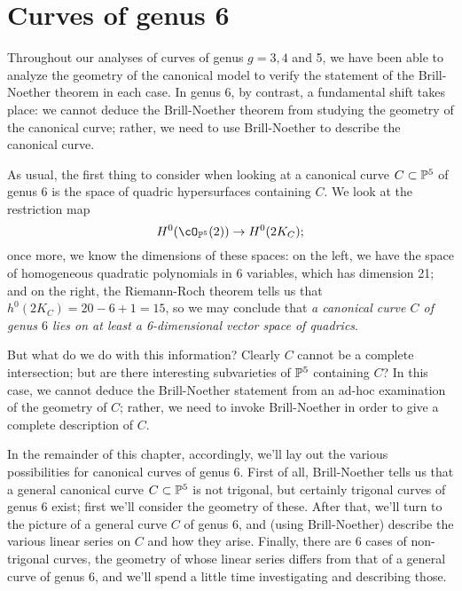

\chapter{Curves of genus 6}\label{genus 6 chapter}


Throughout our analyses of curves of genus $g = 3, 4$ and 5, we have been able to analyze the geometry of the canonical model to verify the statement of the Brill-Noether theorem in each case. In genus 6, by contrast, a fundamental shift takes place: we cannot deduce the Brill-Noether theorem from studying the geometry of the canonical curve; rather, we need to use Brill-Noether to describe the canonical curve.

As usual, the first thing to consider when looking at a canonical curve $C \subset \PP^5$ of genus 6 is the space of quadric hypersurfaces containing $C$. We look at the restriction map
$$
H^0(\cO_{\PP^5}(2)) \to H^0(2K_C);
$$
once more, we know the dimensions of these spaces: on the left, we have the space of homogeneous quadratic polynomials in 6 variables, which has dimension 21; and on the right, the Riemann-Roch theorem tells us that $h^0(2K_C) = 20 - 6 + 1 = 15$, so we may conclude that \emph{a canonical curve $C$ of genus $6$ lies on at least a 6-dimensional vector space of quadrics}.

But what do we do with this information? Clearly $C$ cannot be a complete intersection; but are there interesting subvarieties of $\PP^5$ containing $C$? In this case, we cannot deduce the Brill-Noether statement from an ad-hoc examination of the geometry of $C$; rather, we need to invoke Brill-Noether in order to give a complete description of $C$.

In the remainder of this chapter, accordingly, we'll lay out the various possibilities for canonical curves of genus 6. First of all,  Brill-Noether tells us that a general canonical curve $C \subset \PP^5$ is not trigonal, but certainly trigonal curves of genus 6 exist; first we'll consider the geometry of these. After that, we'll turn to the picture of a general curve $C$ of genus 6, and (using Brill-Noether) describe the various linear series on $C$ and how they arise. Finally, there are 6 cases of non-trigonal curves, the geometry of whose linear series differs from that of a general curve of genus 6, and we'll spend a little time investigating and describing those.

